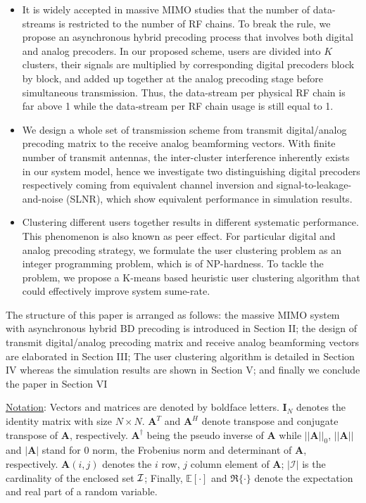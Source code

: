 \documentclass[conference]{IEEEtran}
\begin{document}
\begin{itemize}
\item It is widely accepted in massive MIMO studies that the number of data-streams is restricted to the number of RF chains. To break the rule, we propose an asynchronous hybrid precoding process that involves both digital and analog precoders. In our proposed scheme, users are divided into $K$ clusters, their signals are multiplied by corresponding digital precoders block by block, and added up together at the analog precoding stage before simultaneous transmission. Thus, the data-stream per physical RF chain is far above 1 while the data-stream per RF chain usage is still equal to 1.
\item We design a whole set of transmission scheme from transmit digital/analog precoding matrix to the receive analog beamforming vectors. With finite number of transmit antennas, the inter-cluster interference inherently exists in our system model, hence we investigate two distinguishing digital precoders respectively coming from equivalent channel inversion and signal-to-leakage-and-noise (SLNR), which show equivalent performance in simulation results.
\item Clustering different users together results in different systematic performance. This phenomenon is also known as peer effect. For particular digital and analog precoding strategy, we formulate the user clustering problem as an integer programming problem, which is of NP-hardness. To tackle the problem, we propose a K-means based heuristic user clustering algorithm that could effectively improve system sume-rate.
\end{itemize}



The structure of this paper is arranged as follows: the massive MIMO system with asynchronous hybrid BD precoding is introduced in Section II; the design of transmit digital/analog precoding matrix and receive analog beamforming vectors are elaborated in Section III; The user clustering algorithm is detailed in Section IV whereas the simulation results are shown in Section V; and finally we conclude the paper in Section VI

\underline{Notation}: Vectors and matrices are denoted by boldface letters. $\bm{I}_N$ denotes the identity matrix with size $N\times N$. ${\bm A}^T$ and ${\bm A}^H$ denote transpose and conjugate transpose of ${\bm A}$, respectively. $\bm{A}^\dagger$ being the pseudo inverse of $\bm{A}$ while $||\bm{A}||_0$, $||\bm{A}|| $ and $|\bm{A}|$ stand for $0$ norm, the Frobenius norm and determinant of ${\bm A}$, respectively. $\bm{A}(i,j)$ denotes the $i$ row, $j$ column element of ${\bm A}$; $|\mathcal{I}|$ is the cardinality of the enclosed set ${\cal I}$; Finally, $\mathbb{E}[\cdot] $ and $\Re\{\cdot\}$ denote the expectation and real part of a random variable.
\end{document}
